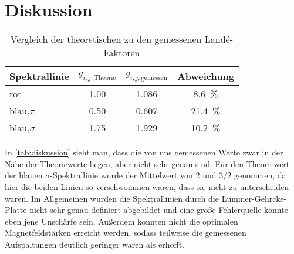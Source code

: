 \section{Diskussion}
\label{sec:Diskussion}

\begin{table}
    \centering
    \caption{Vergleich der theoretischen zu den gemessenen Landé-Faktoren}
    \label{tab:diskussion}
    \begin{tabular}{l S[table-format=1.2] S[table-format=1.3] c}
        \toprule
        Spektrallinie & $g_{i,j,\text{Theorie}}$ & $g_{i,j,\text{gemessen}}$ & Abweichung \\
        \midrule
        rot             & 1.00 & 1.086 & \SI{8.6}{\percent} \\
        blau,$\pi$      & 0.50 & 0.607 & \SI{21.4}{\percent} \\
        blau,$\sigma$   & 1.75 & 1.929 & \SI{10.2}{\percent} \\
        \bottomrule
    \end{tabular}
\end{table}

In \autoref{tab:diskussion} sieht man, dass die von uns gemessenen Werte zwar in der Nähe der Theoriewerte liegen,
aber nicht sehr genau sind.
Für den Theoriewert der blauen $\sigma$-Spektrallinie wurde der Mittelwert von 2 und $3/2$ genommen, 
da hier die beiden Linien so verschwommen waren, dass sie nicht zu unterscheiden waren.
Im Allgemeinen wurden die Spektrallinien durch die Lummer-Gehrcke-Platte nicht sehr genau definiert abgebildet
und eine große Fehlerquelle könnte eben jene Unschärfe sein.
Außerdem konnten nicht die optimalen Magnetfeldstärken erreicht werden, 
sodass teilweise die gemessenen Aufspaltungen deutlich geringer waren als erhofft.
